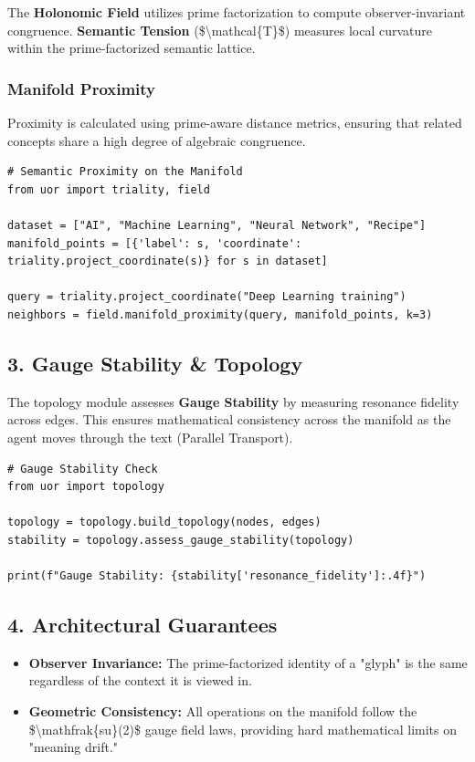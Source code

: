 \documentclass[12pt,a4paper]{article}
\providecommand{\tightlist}{\setlength{\itemsep}{0pt}\setlength{\parskip}{0pt}}
\begin{document}
The \textbf{Holonomic Field} utilizes prime factorization to compute
observer-invariant congruence. \textbf{Semantic Tension}
(\$\textbackslash mathcal\{T\}\$) measures local curvature within the
prime-factorized semantic lattice.

\subsubsection{Manifold Proximity}\label{manifold-proximity}

Proximity is calculated using prime-aware distance metrics, ensuring
that related concepts share a high degree of algebraic congruence.

\begin{verbatim}
# Semantic Proximity on the Manifold
from uor import triality, field

dataset = ["AI", "Machine Learning", "Neural Network", "Recipe"]
manifold_points = [{'label': s, 'coordinate': triality.project_coordinate(s)} for s in dataset]

query = triality.project_coordinate("Deep Learning training")
neighbors = field.manifold_proximity(query, manifold_points, k=3)
\end{verbatim}

\subsection{3. Gauge Stability \&
Topology}\label{gauge-stability-topology}

The topology module assesses \textbf{Gauge Stability} by measuring
resonance fidelity across edges. This ensures mathematical consistency
across the manifold as the agent moves through the text (Parallel
Transport).

\begin{verbatim}
# Gauge Stability Check
from uor import topology

topology = topology.build_topology(nodes, edges)
stability = topology.assess_gauge_stability(topology)

print(f"Gauge Stability: {stability['resonance_fidelity']:.4f}")
\end{verbatim}

\subsection{4. Architectural Guarantees}\label{architectural-guarantees}

\begin{itemize}
\tightlist
\item
  \textbf{Observer Invariance:} The prime-factorized identity of a
  "glyph" is the same regardless of the context it is viewed in.
\item
  \textbf{Geometric Consistency:} All operations on the manifold follow
  the \$\textbackslash mathfrak\{su\}(2)\$ gauge field laws, providing
  hard mathematical limits on "meaning drift."
\end{itemize}
\end{document}
